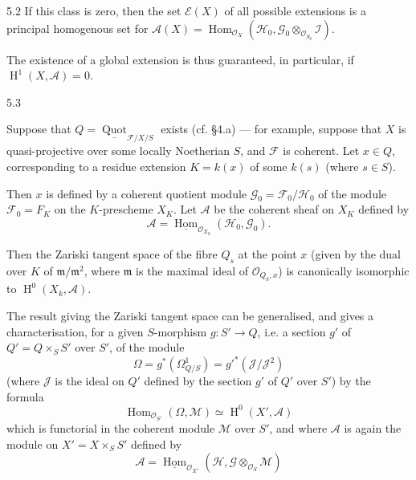 \begin{corollary}{5.2}
    If this class is zero, then the set \(\mathscr {E}(X)\) of all possible extensions is a principal homogenous set for \(\mathscr {A}(X)=\operatorname {Hom}_{\mathcal {O}_X}(\mathscr {H}_0,\mathscr {G}_0\otimes _{\mathcal {O}_{S_0}}\mathscr {I})\).\end{corollary}\par{}The existence of a global extension is thus guaranteed, in particular, if \(\operatorname {H}^1(X,\mathscr {A})=0\).\begin{corollary}{5.3}\label{fga3.iv-5-corollary-5.3}\skipsinglepar\par{}Suppose that \(Q=\underline {\operatorname {Quot}}_{\mathscr {F}/X/S}\) exists (cf. §4.a) --- for example, suppose that \(X\) is quasi-projective over some locally Noetherian \(S\), and \(\mathscr {F}\) is coherent.
    Let \(x\in  Q\), corresponding to a residue extension \(K=k(x)\) of some \(k(s)\) (where \(s\in  S\)).
    
    Then \(x\) is defined by a coherent quotient module \(\mathscr {G}_0=\mathscr {F}_0/\mathscr {H}_0\) of the module \(\mathscr {F}_0=F_K\) on the \(K\)-prescheme \(X_K\).
    Let \(\mathscr {A}\) be the coherent sheaf on \(X_K\) defined by
    \[       \mathscr {A} = \underline {\operatorname {Hom}}_{\mathcal {O}_{X_0}}(\mathscr {H}_0,\mathscr {G}_0).     \]

    Then the Zariski tangent space of the fibre \(Q_s\) at the point \(x\) (given by the dual over \(K\) of \(\mathfrak {m}/\mathfrak {m}^2\), where \(\mathfrak {m}\) is the maximal ideal of \(\mathcal {O}_{Q_k,x}\)) is canonically isomorphic to \(\operatorname {H}^0(X_k,\mathscr {A})\).\end{corollary}\par{}The result giving the Zariski tangent space can be generalised, and gives a characterisation, for a given \(S\)-morphism \(g\colon  S'\to  Q\), i.e. a section \(g'\) of \(Q'=Q\times _S S'\) over \(S'\), of the module
  \[     \Omega      = g^*(\Omega _{Q/S}^1)     = {g'}^*(\mathscr {J}/\mathscr {J}^2)   \]
  (where \(\mathscr {J}\) is the ideal on \(Q'\) defined by the section \(g'\) of \(Q'\) over \(S'\)) by the formula
  \[     \operatorname {Hom}_{\mathcal {O}_{S'}}(\Omega ,\mathscr {M})     \simeq  \operatorname {H}^0(X',\mathscr {A})   \]
  which is functorial in the coherent module \(\mathscr {M}\) over \(S'\), and where \(\mathscr {A}\) is again the module on \(X'=X\times _S S'\) defined by
  \[     \mathscr {A} = \underline {\operatorname {Hom}}_{\mathcal {O}_{X'}}(\mathscr {H},\mathscr {G}\otimes _{\mathcal {O}_S}\mathscr {M})   \]
